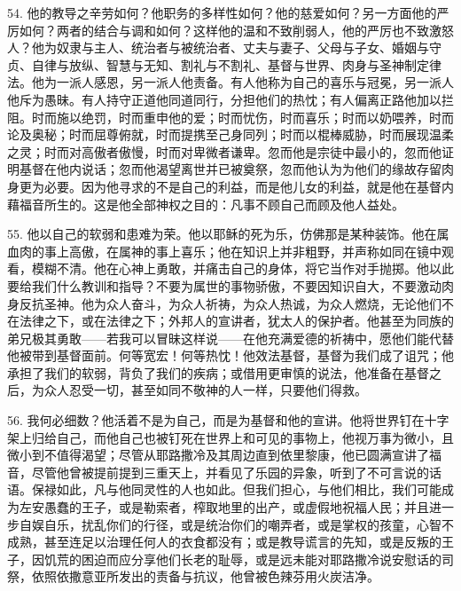 54. 他的教导之辛劳如何？他职务的多样性如何？他的慈爱如何？另一方面他的严厉如何？两者的结合与调和如何？这样他的温和不致削弱人，他的严厉也不致激怒人？他为奴隶与主人、统治者与被统治者、丈夫与妻子、父母与子女、婚姻与守贞、自律与放纵、智慧与无知、割礼与不割礼、基督与世界、肉身与圣神制定律法。他为一派人感恩，另一派人他责备。有人他称为自己的喜乐与冠冕，另一派人他斥为愚昧。有人持守正道他同道同行，分担他们的热忱；有人偏离正路他加以拦阻。时而施以绝罚，时而重申他的爱；时而忧伤，时而喜乐；时而以奶喂养，时而论及奥秘；时而屈尊俯就，时而提携至己身同列；时而以棍棒威胁，时而展现温柔之灵；时而对高傲者傲慢，时而对卑微者谦卑。忽而他是宗徒中最小的，忽而他证明基督在他内说话；忽而他渴望离世并已被奠祭，忽而他认为为他们的缘故存留肉身更为必要。因为他寻求的不是自己的利益，而是他儿女的利益，就是他在基督内藉福音所生的。这是他全部神权之目的：凡事不顾自己而顾及他人益处。\par

55. 他以自己的软弱和患难为荣。他以耶稣的死为乐，仿佛那是某种装饰。他在属血肉的事上高傲，在属神的事上喜乐；他在知识上并非粗野，并声称如同在镜中观看，模糊不清。他在心神上勇敢，并痛击自己的身体，将它当作对手抛掷。他以此要给我们什么教训和指导？不要为属世的事物骄傲，不要因知识自大，不要激动肉身反抗圣神。他为众人奋斗，为众人祈祷，为众人热诚，为众人燃烧，无论他们不在法律之下，或在法律之下；外邦人的宣讲者，犹太人的保护者。他甚至为同族的弟兄极其勇敢——若我可以冒昧这样说——在他充满爱德的祈祷中，愿他们能代替他被带到基督面前。何等宽宏！何等热忱！他效法基督，基督为我们成了诅咒；他承担了我们的软弱，背负了我们的疾病；或借用更审慎的说法，他准备在基督之后，为众人忍受一切，甚至如同不敬神的人一样，只要他们得救。\par

56. 我何必细数？他活着不是为自己，而是为基督和他的宣讲。他将世界钉在十字架上归给自己，而他自己也被钉死在世界上和可见的事物上，他视万事为微小，且微小到不值得渴望；尽管从耶路撒冷及其周边直到依里黎康，他已圆满宣讲了福音，尽管他曾被提前提到三重天上，并看见了乐园的异象，听到了不可言说的话语。保禄如此，凡与他同灵性的人也如此。但我们担心，与他们相比，我们可能成为左安愚蠢的王子，或是勒索者，榨取地里的出产，或虚假地祝福人民；并且进一步自娱自乐，扰乱你们的行径，或是统治你们的嘲弄者，或是掌权的孩童，心智不成熟，甚至连足以治理任何人的衣食都没有；或是教导谎言的先知，或是反叛的王子，因饥荒的困迫而应分享他们长老的耻辱，或是远未能对耶路撒冷说安慰话的司祭，依照依撒意亚所发出的责备与抗议，他曾被色辣芬用火炭洁净。\par

